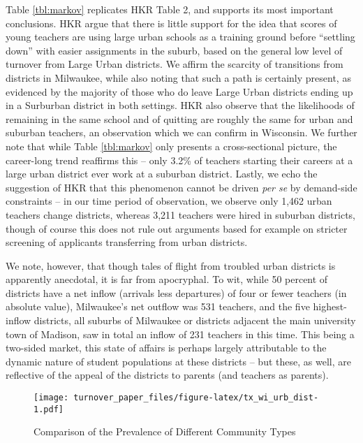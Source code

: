 \documentclass[12pt,]{article}
\begin{document}
Table \ref{tbl:markov} replicates HKR Table 2, and supports its most
important conclusions. HKR argue that there is little support for the
idea that scores of young teachers are using large urban schools as a
training ground before ``settling down'' with easier assignments in the
suburb, based on the general low level of turnover from Large Urban
districts. We affirm the scarcity of transitions from districts in
Milwaukee, while also noting that such a path is certainly present, as
evidenced by the majority of those who do leave Large Urban districts
ending up in a Surburban district in both settings. HKR also observe
that the likelihoods of remaining in the same school and of quitting are
roughly the same for urban and suburban teachers, an observation which
we can confirm in Wisconsin. We further note that while Table
\ref{tbl:markov} only presents a cross-sectional picture, the
career-long trend reaffirms this -- only 3.2\% of teachers starting
their careers at a large urban district ever work at a suburban
district. Lastly, we echo the suggestion of HKR that this phenomenon
cannot be driven \emph{per se} by demand-side constraints -- in our time
period of observation, we observe only 1,462 urban teachers change
districts, whereas 3,211 teachers were hired in suburban districts,
though of course this does not rule out arguments based for example on
stricter screening of applicants transferring from urban districts.

We note, however, that though tales of flight from troubled urban
districts is apparently anecdotal, it is far from apocryphal. To wit,
while 50 percent of districts have a net inflow (arrivals less
departures) of four or fewer teachers (in absolute value), Milwaukee's
net outflow was 531 teachers, and the five highest-inflow districts, all
suburbs of Milwaukee or districts adjacent the main university town of
Madison, saw in total an inflow of 231 teachers in this time. This being
a two-sided market, this state of affairs is perhaps largely
attributable to the dynamic nature of student populations at these
districts -- but these, as well, are reflective of the appeal of the
districts to parents (and teachers as parents).

\begin{figure}[htbp]
\centering
\texttt{[image: turnover\_paper\_files/figure-latex/tx\_wi\_urb\_dist-1.pdf]}
\caption{\label{fig:ti_wi_urb}Comparison of the Prevalence of Different
Community Types}
\end{figure}
\end{document}
